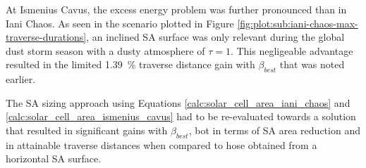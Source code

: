 At Ismenius Cavus, the excess energy problem was further pronounced than in Iani Chaos. As seen in the scenario plotted in Figure \ref{fig:plot:sub:iani-chaos-max-traverse-durations}, an inclined \ac{SA} surface was only relevant during the global dust storm season with a dusty atmosphere of $\tau = 1$. This negligeable advantage resulted in the limited \SI{1.39}{\percent} traverse distance gain with $\beta_{best}$ that was noted earlier.

The \ac{SA} sizing approach using Equations \ref{calc:solar_cell_area_iani_chaos} and \ref{calc:solar_cell_area_ismenius_cavus} had to be re-evaluated towards a solution that resulted in significant gains with $\beta_{best}$, bot in terms of \ac{SA} area reduction and in attainable traverse distances when compared to hose obtained from a horizontal \ac{SA} surface.


